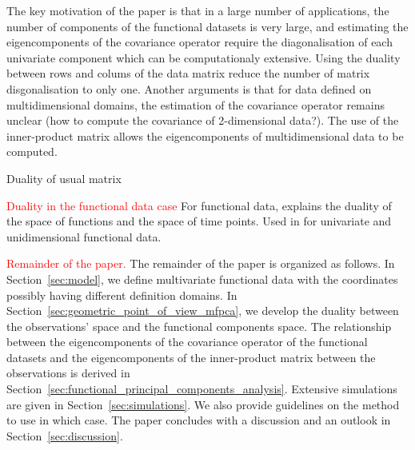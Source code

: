 The key motivation of the paper is that in a large number of applications, the number of components of the functional datasets is very large, and estimating the eigencomponents of the covariance operator require the diagonalisation of each univariate component which can be computationaly extensive. Using the duality between rows and colums of the data matrix reduce the number of matrix disgonalisation to only one. Another arguments is that for data defined on multidimensional domains, the estimation of the covariance operator remains unclear (how to compute the covariance of 2-dimensional data?). The use of the inner-product matrix allows the eigencomponents of multidimensional data to be computed.

Duality of usual matrix \cite{escofierTraitementSimultaneVariables1979,saportaSimultaneousAnalysisQualitative1990,pagesAnalyseFactorielleDonnees2004,hardleAppliedMultivariateStatistical2019}


\textcolor{red}{Duality in the functional data case}
For functional data, \cite{ramsayWhenDataAre1982a} explains the duality of the space of functions and the space of time points. Used in \cite{benkoCommonFunctionalPrincipal2009} for univariate and unidimensional functional data. \cite{chenQuantifyingInfiniteDimensionalData2017}


\textcolor{red}{Remainder of the paper.}
The remainder of the paper is organized as follows. In Section~\ref{sec:model}, we define multivariate functional data with the coordinates possibly having different definition domains. In Section~\ref{sec:geometric_point_of_view_mfpca}, we develop the duality between the observations' space and the functional components space. The relationship between the eigencomponents of the covariance operator of the functional datasets and the eigencomponents of the inner-product matrix between the observations is derived in Section~\ref{sec:functional_principal_components_analysis}. Extensive simulations are given in Section~\ref{sec:simulations}. We also provide guidelines on the method to use in which case. The paper concludes with a discussion and an outlook in Section~\ref{sec:discussion}.

